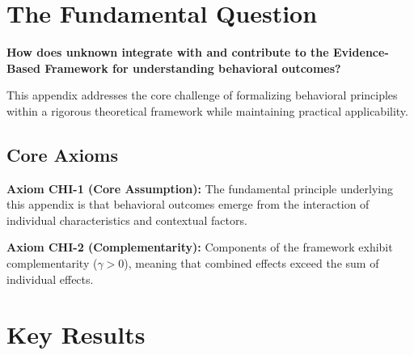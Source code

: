 \documentclass[11pt]{article}
\begin{document}

\section{The Fundamental Question}
\label{sec:chi-fundamental}

\begin{tcolorbox}[
    colback=red!5!white,
    colframe=red!75!black,
    title={\textbf{Fundamental Question}}
]
\textbf{How does unknown integrate with and contribute to the
Evidence-Based Framework for understanding behavioral outcomes?}

This appendix addresses the core challenge of formalizing behavioral principles
within a rigorous theoretical framework while maintaining practical applicability.
\end{tcolorbox}



\subsection{Core Axioms}
\label{sec:chi-axioms}

\begin{tcolorbox}[colback=yellow!5!white,colframe=yellow!75!black,title=Axiom CHI-1: Fundamental Principle]
\textbf{Axiom CHI-1 (Core Assumption):}
The fundamental principle underlying this appendix is that behavioral outcomes
emerge from the interaction of individual characteristics and contextual factors.
\end{tcolorbox}

\begin{tcolorbox}[colback=yellow!5!white,colframe=yellow!75!black,title=Axiom CHI-2: Complementarity]
\textbf{Axiom CHI-2 (Complementarity):}
Components of the framework exhibit complementarity ($\gamma > 0$), meaning
that combined effects exceed the sum of individual effects.
\end{tcolorbox}


\section{Key Results}
\label{sec:chi-results}
\end{document}
